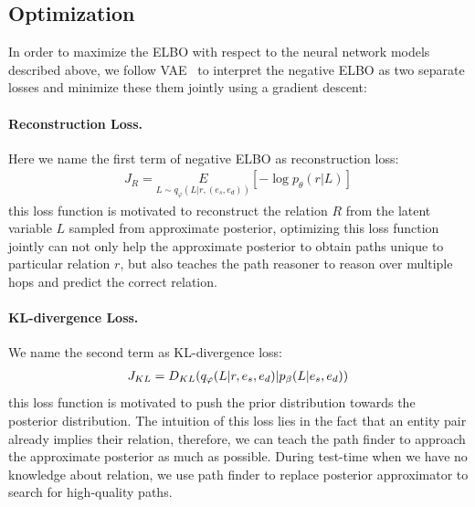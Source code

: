 \documentclass[11pt,a4paper]{article}
\newcommand{\expect}[1]{\underset{#1}{E}}
\begin{document}
\subsection{Optimization}
In order to maximize the ELBO with respect to the neural network models described above, we follow VAE~\cite{kingma2013auto} to interpret the negative ELBO as two separate losses and minimize these them jointly using a gradient descent: 
\paragraph{Reconstruction Loss.} Here we name the first term of negative ELBO as reconstruction loss:
\begin{align}
J_R = \expect{L \sim q_{\varphi}(L|r, (e_s, e_d))} [-\log p_{\theta}(r|L)]
\end{align}
this loss function is motivated to reconstruct the relation $R$ from the latent variable $L$ sampled from approximate posterior, optimizing this loss function jointly can not only help the approximate posterior to obtain paths unique to particular relation $r$, but also teaches the path reasoner to reason over multiple hops and predict the correct relation.
\paragraph{KL-divergence Loss.} We name the second term as KL-divergence loss:
\begin{align}
\small
J_{KL} = D_{KL}(q_{\varphi}(L|r, e_s, e_d)|p_{\beta}(L|e_s, e_d))
\end{align}
this loss function is motivated to push the prior distribution towards the posterior distribution. The intuition of this loss lies in the fact that an entity pair already implies their relation, therefore, we can teach the path finder to approach the approximate posterior as much as possible. During test-time when we have no knowledge about relation, we use path finder to replace posterior approximator to search for high-quality paths.
\end{document}

